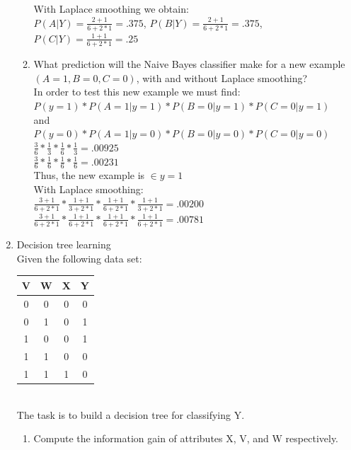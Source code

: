 \documentclass[12pt,letterpaper]{article}
\begin{document}
\begin{enumerate}
\begin{enumerate}
		With Laplace smoothing we obtain: \\
		$P(A|Y) = \frac{2+1}{6+2*1} = .375$, $P(B|Y) = \frac{2+1}{6+2*1} = .375$, $P(C|Y) = \frac{1+1}{6+2*1} = .25$ \\
		\item What prediction will the Naive Bayes classifier make for a new example $(A = 1, B = 0, C = 0)$, with and without Laplace smoothing? \\
		In order to test this new example we must find: \\
		$P(y = 1)*P(A = 1 | y = 1)*P(B = 0 | y = 1)*P(C = 0 | y = 1)$ \\
		and \\
		$P(y = 0)*P(A = 1 | y = 0)*P(B = 0 | y = 0)*P(C = 0 | y = 0)$ \\
		 $\frac{3}{6} * \frac{1}{3} * \frac{1}{6} * \frac{1}{3} = .00925$ \\
		 $\frac{3}{6} * \frac{1}{6} * \frac{1}{6} * \frac{1}{6} = .00231$ \\
		Thus, the new example is $\in y = 1$ \\
		With Laplace smoothing: \\
		 $\frac{3+1}{6 + 2*1} * \frac{1+1}{3 + 2*1} * \frac{1 + 1}{6 + 2*1} * \frac{1 + 1}{3 + 2*1} = .00200$ \\
		 $\frac{3+1}{6 + 2*1} * \frac{1+1}{6 + 2*1} * \frac{1 + 1}{6 + 2*1} * \frac{1 + 1}{6 + 2*1} = .00781$ \\
	\end{enumerate}
	\item Decision tree learning \\
	Given the following data set: \\[15mm]
	\begin{tabular}{c | c | c || c } 
	V & W & X & Y \\ \hline
	0 & 0 & 0 & 0 \\ \hline 
	0 & 1 & 0 & 1 \\ \hline
	1 & 0 & 0 & 1 \\ \hline 
	1 & 1 & 0 & 0 \\ \hline 
	1 & 1 & 1 & 0 \\ \hline 
	\end{tabular} \\[15mm]
	The task is to build a decision tree for classifying Y. \\
	\begin{enumerate} 
		\item Compute the information gain of attributes X, V, and W respectively. \\

\end{enumerate}
\end{enumerate}
\end{document}
